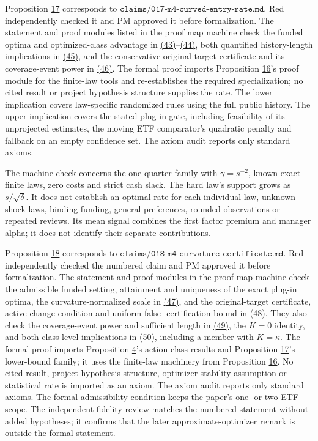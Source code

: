 \documentclass[11pt]{article}
\begin{document}
Proposition \hyperref[res:Proposition-17]{17} corresponds to
\(\texttt{claims/017-m4-curved-entry-rate.md}\). Red independently
checked it and PM approved it before formalization. The statement
and proof modules listed in the proof map machine check the funded
optima and optimized-class advantage in \hyperref[eq:43]{(43)}--\hyperref[eq:44]{(44)}, both quantified
history-length implications in \hyperref[eq:45]{(45)}, and the conservative
original-target certificate and its coverage-event power in \hyperref[eq:46]{(46)}.
The formal proof imports Proposition \hyperref[res:Proposition-16]{16}'s proof module for the
finite-law tools and re-establishes the required specialization;
no cited result or project hypothesis structure supplies the rate.
The lower implication covers law-specific randomized rules using
the full public history. The upper implication covers the stated
plug-in gate, including feasibility of its unprojected estimates,
the moving ETF comparator's quadratic penalty and fallback on an
empty confidence set. The axiom audit reports only standard axioms.

The machine check concerns the one-quarter family with
\(\gamma=s^{-2}\), known exact finite laws, zero costs and strict
cash slack. The hard law's support grows as \(s/\sqrt\delta\).
It does not establish an optimal rate for each individual law,
unknown shock laws, binding funding, general preferences, rounded
observations or repeated
reviews. Its mean signal combines the first factor premium and
manager alpha; it does not identify their separate contributions.

Proposition \hyperref[res:Proposition-18]{18} corresponds to
\(\texttt{claims/018-m4-curvature-certificate.md}\). Red
independently checked the numbered claim and PM approved it
before formalization. The statement and proof modules in the
proof map machine check the admissible funded setting,
attainment and uniqueness of the exact plug-in optima, the
curvature-normalized scale in \hyperref[eq:47]{(47)}, and the original-target
certificate, active-change condition and uniform false-
certification bound in \hyperref[eq:48]{(48)}. They also check the coverage-event
power and sufficient length in \hyperref[eq:49]{(49)}, the \(K=0\) identity,
and both class-level implications in \hyperref[eq:50]{(50)}, including a member
with \(K=\kappa\). The formal proof imports Proposition \hyperref[res:Proposition-4]{4}'s
action-class results and Proposition \hyperref[res:Proposition-17]{17}'s lower-bound family;
it uses the finite-law machinery from Proposition \hyperref[res:Proposition-16]{16}. No
cited result, project hypothesis structure, optimizer-stability
assumption or statistical rate is imported as an axiom. The
axiom audit reports only standard axioms. The formal
admissibility condition keeps the paper's one- or two-ETF
scope. The independent fidelity review matches the numbered
statement without added hypotheses; it confirms that the
later approximate-optimizer remark is outside the formal
statement.
\end{document}
